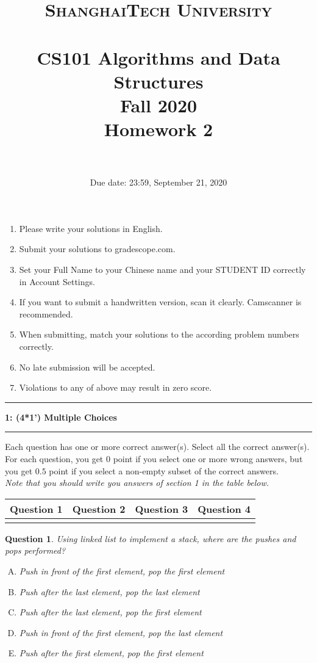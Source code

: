 \documentclass[10.5pt]{article}
\title{
	\normalfont \normalsize
	\textsc{ShanghaiTech University} \\ [25pt]
	\horrule{0.5pt} \\[0.4cm] %
	\huge CS101 Algorithms and Data Structures\\ %
	\LARGE Fall 2020\\
	\LARGE Homework 2\\
	\horrule{2pt} \\[0.5cm] %
}
\author{}
\date{Due date: 23:59, September 21, 2020}
\newcommand\question[2]{\vspace{.25in}\hrule\textbf{#1: #2}\vspace{.5em}\hrule\vspace{.10in}}
\newtheorem{Q}{Question}
\begin{document}
	\maketitle
	\thispagestyle{firstpage}
	\vspace{3ex}
	
	\begin{enumerate}
		\item Please write your solutions in English. 
		
		\item Submit your solutions to gradescope.com.  
		
		\item Set your Full Name to your Chinese name and your STUDENT ID correctly in Account Settings. 
		
		\item If you want to submit a handwritten version, scan it clearly. Camscanner is recommended. 
		
		\item When submitting, match your solutions to the according problem numbers correctly. 
		
		\item No late submission will be accepted.
		
		\item Violations to any of above may result in zero score. 
	\end{enumerate}
	\newpage
	
\question{1}{(4*1') Multiple Choices}

Each question has one or more correct answer(s). Select all the correct answer(s). For each question, you get $0$ point if you select one or more wrong answers, but you get $0.5$ point if you select a non-empty subset of the correct answers.\\
\textit{Note that you should write you answers of section 1 in the table below.}
\begin{table}[htbp]
	\begin{tabular}{|p{2cm}|p{2cm}|p{2cm}|p{2cm}|}
		\hline 
		Question 1 & Question 2 & Question 3 & Question 4  \\ 
		\hline 
		&  &  &  \\ 
		\hline 
	\end{tabular} 
\end{table}

\begin{Q}
	Using linked list to implement a stack, where are the pushes and pops performed?
	\begin{enumerate}[(A)]
		\item Push in front of the first element, pop the first element
		\item Push after the last element, pop the last element
		\item Push after the last element, pop the first element
		\item Push in front of the first element, pop the last element
		\item Push after the first element, pop the first element
	\end{enumerate}
\end{Q}
\end{document}
